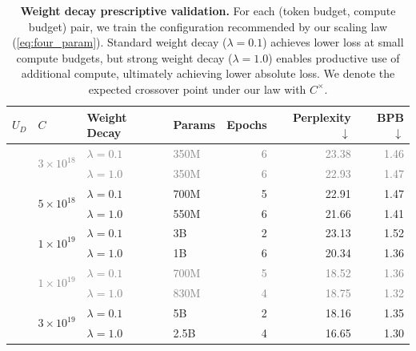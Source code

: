 \begin{table}[t]
    \centering
    \caption{\textbf{Weight decay prescriptive validation.} For each (token budget, compute budget) pair, we train the configuration recommended by our scaling law (\autoref{eq:four_param}). Standard weight decay ($\lambda = 0.1$) achieves lower loss at small compute budgets, but strong weight decay ($\lambda = 1.0$) enables productive use of additional compute, ultimately achieving lower absolute loss. We denote the expected crossover point under our law with $C^{\times}$.}
    \label{tab:wd_validation}
    \begin{tabular}{llllrrr}
        \toprule
        $U_D$ & $C$ & Weight Decay & Params & Epochs & Perplexity $\downarrow$ & BPB  $\downarrow$\\
        \midrule
        & 
        & \textcolor{gray}{$\lambda = 0.1$} & \textcolor{gray}{350M} & \textcolor{gray}{6} & \textcolor{gray}{23.38} & \textcolor{gray}{1.46} \\
        & & \textcolor{gray}{$\lambda = 1.0$} & \textcolor{gray}{350M} & \textcolor{gray}{6} & \textcolor{gray}{22.93} & \textcolor{gray}{1.47} \\
        \cmidrule(l){2-7}
        & 
        & $\lambda = 0.1$ & 700M & 5 & 22.91 & 1.47 \\
        & & $\lambda = 1.0$ & 550M & 6 & {21.66} & {1.41} \\
        \cmidrule(l){2-7}
        & 
        & $\lambda = 0.1$ & 3B & 2 & 23.13 & 1.52 \\
        & & $\lambda = 1.0$ & 1B & 6 & {20.34} & {1.36} \\
        \midrule
        & 
        & \textcolor{gray}{$\lambda = 0.1$} & \textcolor{gray}{700M} & \textcolor{gray}{5} & \textcolor{gray}{18.52} & \textcolor{gray}{1.36} \\
        & & \textcolor{gray}{$\lambda = 1.0$} & \textcolor{gray}{830M} & \textcolor{gray}{4} & \textcolor{gray}{18.75} & \textcolor{gray}{1.32} \\
        \cmidrule(l){2-7}
        & 
        & $\lambda = 0.1$ & 5B & 2 & 18.16 & 1.35 \\
        & & $\lambda = 1.0$ & 2.5B & 4 & {16.65} & {1.30} \\
        \bottomrule
    \end{tabular}
    \vspace{-1.5em}
\end{table}


